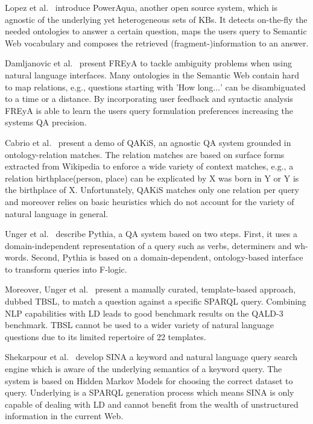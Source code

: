 {Lopez et al.~\cite{poweraqua}} introduce {PowerAqua}, another open source system, which is agnostic of the underlying yet heterogeneous sets of \ac{KB}s. 
It detects on-the-fly the needed ontologies to answer a certain question, maps the users query to Semantic Web vocabulary and composes the retrieved (fragment-)information to an answer. 

{Damljanovic et al.~\cite{freya}} present {FREyA} to tackle ambiguity problems when using natural language interfaces. 
Many ontologies in the Semantic Web contain hard to map relations, e.g., questions starting with 'How long$\ldots$' can be disambiguated to a time or a distance. 
By incorporating user feedback and syntactic analysis FREyA is able to learn the users query formulation preferences increasing the systems \ac{QA} precision. 

{Cabrio et al.~\cite{qakis}} present a demo of {QAKiS}, an agnostic \ac{QA} system grounded in ontology-relation matches. 
The relation matches are based on surface forms extracted from Wikipedia to enforce a wide variety of context matches, e.g., a relation birthplace(person, place) can be explicated by X was born in Y or Y is the birthplace of X. 
Unfortunately, QAKiS matches only one relation per query and moreover relies on basic heuristics which do not account for the variety of natural language in general.

{Unger et al.~\cite{pythia}} describe {Pythia}, a \ac{QA} system based on two steps.
First, it uses a domain-independent representation of a query such as verbs, determiners and wh-words.
Second, Pythia is based on a domain-dependent, ontology-based interface to transform queries into F-logic.


Moreover, Unger et al.~\cite{template} present a manually curated, template-based approach, dubbed {TBSL}, to match a question against a specific SPARQL query. 
Combining \ac{NLP} capabilities with \ac{LD} leads to good benchmark results on the \ac{QALD}-3 benchmark.
TBSL cannot be used to a wider variety of natural language questions due to its limited repertoire of 22 templates.

{Shekarpour et al.~\cite{SINA_WebSemantic}} develop {SINA} a keyword and natural language query search engine which is aware of the underlying semantics of a keyword query. 
The system is based on Hidden Markov Models for choosing the correct dataset to query.
Underlying is a SPARQL generation process which means SINA is only capable of dealing with \ac{LD} and cannot benefit from the wealth of unstructured information in the current Web.


